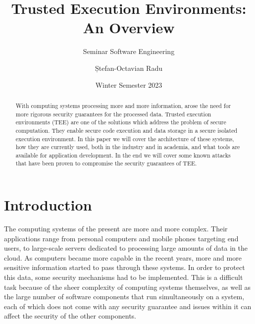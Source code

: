 \documentclass[runningheads,a4paper]{uwsese}
\begin{document}
\mainmatter 

\title{Trusted Execution Environments: An Overview}
\subtitle{Seminar Software Engineering}


\date{Winter Semester 2023}


\author{Ștefan-Octavian Radu}
%


\maketitle

\begin{abstract}

    With computing systems processing more and more information, arose the need
    for more rigorous security guarantees for the processed data. Trusted
    execution environments (TEE) are one of the solutions which address the
    problem of secure computation. They enable secure code execution and data
    storage in a secure isolated execution environment. In this paper we will
    cover the architecture of these systems, how they are currently used, both
    in the industry and in academia, and what tools are available for
    application development. In the end we will cover some known attacks that
    have been proven to compromise the security guarantees of TEE.

\end{abstract}

\section{Introduction}

The computing systems of the present are more and more complex. Their
applications range from personal computers and mobile phones targeting end
users, to large-scale servers dedicated to processing large amounts of data in
the cloud. As computers became more capable in the recent years, more and more
sensitive information started to pass through these systems. In order to
protect this data, some security mechanisms had to be implemented. This is a
difficult task because of the sheer complexity of computing systems themselves,
as well as the large number of software components that run simultaneously on a
system, each of which does not come with any security guarantee and issues
within it can affect the security of the other components. 
\end{document}
